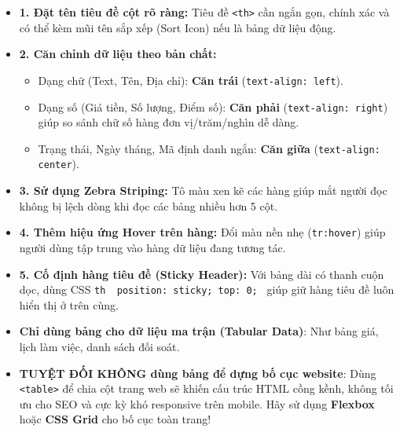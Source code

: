 \documentclass[11pt,oneside]{book}
\newcommand{\codeinline}[1]{\textcolor{accentOrange}{\texttt{#1}}}
\newcommand{\term}[1]{\textbf{\textcolor{primaryBlue}{#1}}}
\begin{document}
\begin{tipBox}
\begin{itemize}[leftmargin=1.5em, itemsep=3pt, parsep=0pt]
    \item \textbf{1. Đặt tên tiêu đề cột rõ ràng:} Tiêu đề \codeinline{<th>} cần ngắn gọn, chính xác và có thể kèm mũi tên sắp xếp (Sort Icon) nếu là bảng dữ liệu động.
    \item \textbf{2. Căn chỉnh dữ liệu theo bản chất:}
        \begin{itemize}
            \item Dạng chữ (Text, Tên, Địa chỉ): \textbf{Căn trái} (\codeinline{text-align: left}).
            \item Dạng số (Giá tiền, Số lượng, Điểm số): \textbf{Căn phải} (\codeinline{text-align: right}) giúp so sánh chữ số hàng đơn vị/trăm/nghìn dễ dàng.
            \item Trạng thái, Ngày tháng, Mã định danh ngắn: \textbf{Căn giữa} (\codeinline{text-align: center}).
        \end{itemize}
    \item \textbf{3. Sử dụng Zebra Striping:} Tô màu xen kẽ các hàng giúp mắt người đọc không bị lệch dòng khi đọc các bảng nhiều hơn 5 cột.
    \item \textbf{4. Thêm hiệu ứng Hover trên hàng:} Đổi màu nền nhẹ (\codeinline{tr:hover}) giúp người dùng tập trung vào hàng dữ liệu đang tương tác.
    \item \textbf{5. Cố định hàng tiêu đề (Sticky Header):} Với bảng dài có thanh cuộn dọc, dùng CSS \codeinline{th { position: sticky; top: 0; }} giúp giữ hàng tiêu đề luôn hiển thị ở trên cùng.
\end{itemize}
\end{tipBox}

\begin{warnBox}
\begin{itemize}[leftmargin=1.5em, itemsep=2pt, parsep=0pt]
    \item \textbf{Chỉ dùng bảng cho dữ liệu ma trận (Tabular Data)}: Như bảng giá, lịch làm việc, danh sách đối soát.
    \item \textbf{TUYỆT ĐỐI KHÔNG dùng bảng để dựng bố cục website}: Dùng \codeinline{<table>} để chia cột trang web sẽ khiến cấu trúc HTML cồng kềnh, không tối ưu cho SEO và cực kỳ khó responsive trên mobile. Hãy sử dụng \term{Flexbox} hoặc \term{CSS Grid} cho bố cục toàn trang!
\end{itemize}
\end{warnBox}
\end{document}
